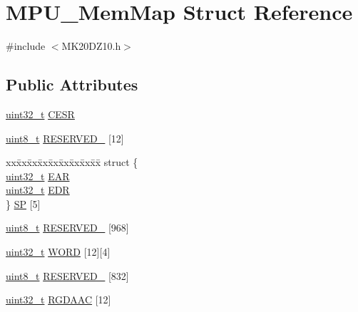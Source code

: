 \hypertarget{struct_m_p_u___mem_map}{}\section{M\+P\+U\+\_\+\+Mem\+Map Struct Reference}
\label{struct_m_p_u___mem_map}


{\ttfamily \#include $<$M\+K20\+D\+Z10.\+h$>$}

\subsection*{Public Attributes}
\begin{DoxyCompactItemize}
\item 
\hyperlink{_p_e___types_8h_a33594304e786b158f3fb30289278f5af}{uint32\+\_\+t} \hyperlink{struct_m_p_u___mem_map_a1cc318bbbdd6c24c5d1ce0df9ebc3c8a}{C\+E\+SR}
\item 
\hyperlink{_p_e___types_8h_aba7bc1797add20fe3efdf37ced1182c5}{uint8\+\_\+t} \hyperlink{struct_m_p_u___mem_map_a3dd74b55a705fe781eb86b887592e24b}{R\+E\+S\+E\+R\+V\+E\+D\+\_} \mbox{[}12\mbox{]}
\item 
\begin{tabbing}
xx\=xx\=xx\=xx\=xx\=xx\=xx\=xx\=xx\=\kill
struct \{\\
\>\hyperlink{_p_e___types_8h_a33594304e786b158f3fb30289278f5af}{uint32\_t} \hyperlink{struct_m_p_u___mem_map_af28c58a8a9b1388f572207a9fcb3cad6}{EAR}\\
\>\hyperlink{_p_e___types_8h_a33594304e786b158f3fb30289278f5af}{uint32\_t} \hyperlink{struct_m_p_u___mem_map_aada7844acbf37325b398320ad59b2049}{EDR}\\
\} \hyperlink{struct_m_p_u___mem_map_addef87c9e6e975909fa0373f37f912dd}{SP} \mbox{[}5\mbox{]}\\

\end{tabbing}\item 
\hyperlink{_p_e___types_8h_aba7bc1797add20fe3efdf37ced1182c5}{uint8\+\_\+t} \hyperlink{struct_m_p_u___mem_map_a063144d8fb358740ad26f84f15b031d8}{R\+E\+S\+E\+R\+V\+E\+D\+\_} \mbox{[}968\mbox{]}
\item 
\hyperlink{_p_e___types_8h_a33594304e786b158f3fb30289278f5af}{uint32\+\_\+t} \hyperlink{struct_m_p_u___mem_map_a368e8f44db9da2769d43df7f33167d78}{W\+O\+RD} \mbox{[}12\mbox{]}\mbox{[}4\mbox{]}
\item 
\hyperlink{_p_e___types_8h_aba7bc1797add20fe3efdf37ced1182c5}{uint8\+\_\+t} \hyperlink{struct_m_p_u___mem_map_a782f60048a9f8cc72aaeb5877b0aa7db}{R\+E\+S\+E\+R\+V\+E\+D\+\_} \mbox{[}832\mbox{]}
\item 
\hyperlink{_p_e___types_8h_a33594304e786b158f3fb30289278f5af}{uint32\+\_\+t} \hyperlink{struct_m_p_u___mem_map_a299d9ea041a2912c3cef5786c597796d}{R\+G\+D\+A\+AC} \mbox{[}12\mbox{]}
\end{DoxyCompactItemize}


